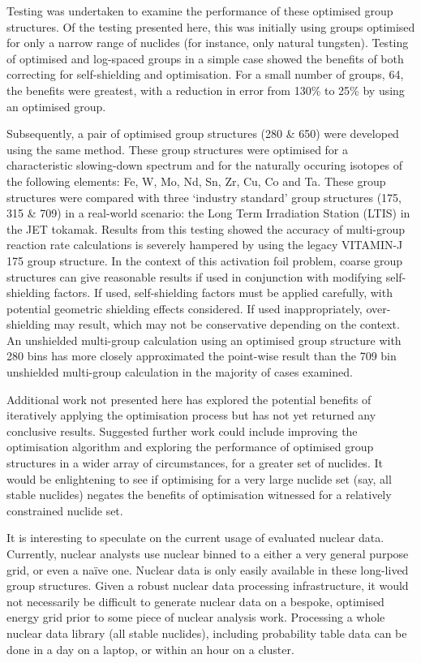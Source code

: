 Testing was undertaken to examine the performance of these optimised group structures. Of the testing presented here, this was initially using groups optimised for only a narrow range of nuclides (for instance, only natural tungsten). Testing of optimised and log-spaced groups in a simple case showed the benefits of both correcting for self-shielding and optimisation. For a small number of groups, 64, the benefits were greatest, with a reduction in error from 130\% to 25\% by using an optimised group.

Subsequently, a pair of optimised group structures (280 \& 650) were developed using the same method. These group structures were optimised for a characteristic slowing-down spectrum and for the naturally occuring isotopes of the following elements: Fe, W, Mo, Nd, Sn, Zr, Cu, Co and Ta. These group structures were compared with three `industry standard' group structures (175, 315 \& 709) in a real-world scenario: the Long Term Irradiation Station (LTIS) in the JET tokamak. Results from this testing showed the accuracy of multi-group reaction rate calculations is severely hampered by using the legacy VITAMIN-J 175 group structure. In the context of this activation foil problem, coarse group structures can give reasonable results if used in conjunction with modifying self-shielding factors. If used, self-shielding factors must be applied carefully, with potential geometric shielding effects considered. If used inappropriately, over-shielding may result, which may not be conservative depending on the context. An unshielded multi-group calculation using an optimised group structure with 280 bins has more closely approximated the point-wise result than the 709 bin unshielded multi-group calculation in the majority of cases examined. 

Additional work not presented here has explored the potential benefits of iteratively applying the optimisation process but has not yet returned any conclusive results. Suggested further work could include improving the optimisation algorithm and exploring the performance of optimised group structures in a wider array of circumstances, for a greater set of nuclides. It would be enlightening to see if optimising for a very large nuclide set (say, all stable nuclides) negates the benefits of optimisation witnessed for a relatively constrained nuclide set. 

It is interesting to speculate on the current usage of evaluated nuclear data. Currently, nuclear analysts use nuclear binned to a either a very general purpose grid, or even a na\"ive one. Nuclear data is only easily available in these long-lived group structures. Given a robust nuclear data processing infrastructure, it would not necessarily be difficult to generate nuclear data on a bespoke, optimised energy grid prior to some piece of nuclear analysis work. Processing a whole nuclear data library (all stable nuclides), including probability table data can be done in a day on a laptop, or within an hour on a cluster. 



